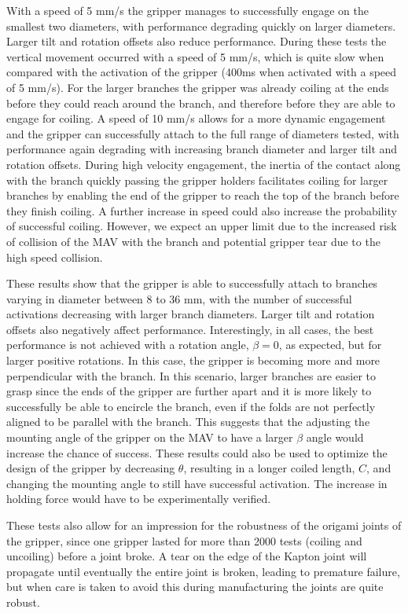 With a speed of 5 mm/s the gripper manages to successfully engage on the smallest two diameters, with performance degrading quickly on larger diameters. Larger tilt and rotation offsets also reduce performance. During these tests the vertical movement occurred with a speed of 5 mm/s, which is quite slow when compared with the activation of the gripper (400ms when activated with a speed of 5 mm/s). For the larger branches the gripper was already coiling at the ends before they could reach around the branch, and therefore before they are able to engage for coiling. A speed of 10 mm/s allows for a more dynamic engagement and the gripper can successfully attach to the full range of diameters tested, with performance again degrading with increasing branch diameter and larger tilt and rotation offsets. During high velocity engagement, the inertia of the contact along with the branch quickly passing the gripper holders facilitates coiling for larger branches by enabling the end of the gripper to reach the top of the branch before they finish coiling. A further increase in speed could also increase the probability of successful coiling. However, we expect an upper limit due to the increased risk of collision of the MAV with the branch and potential gripper tear due to the high speed collision.

These results show that the gripper is able to successfully attach to branches varying in diameter between 8 to 36 mm, with the number of successful activations decreasing with larger branch diameters. Larger tilt and rotation offsets also negatively affect performance. Interestingly, in all cases, the best performance is not achieved with a rotation angle, $\beta=0$, as expected, but for larger positive rotations. In this case, the gripper is becoming more and more perpendicular with the branch. In this scenario, larger branches are easier to grasp since the ends of the gripper are further apart and it is more likely to successfully be able to encircle the branch, even if the folds are not perfectly aligned to be parallel with the branch. This suggests that the adjusting the mounting angle of the gripper on the MAV to have a larger $\beta$ angle would increase the chance of success. These results could also be used to optimize the design of the gripper by decreasing $\theta$, resulting in a longer coiled length, $C$, and changing the mounting angle to still have successful activation. The increase in holding force would have to be experimentally verified.

These tests also allow for an impression for the robustness of the origami joints of the gripper, since one gripper lasted for more than 2000 tests (coiling and uncoiling) before a joint broke. A tear on the edge of the Kapton joint will propagate until eventually the entire joint is broken, leading to premature failure, but when care is taken to avoid this during manufacturing the joints are quite robust.

